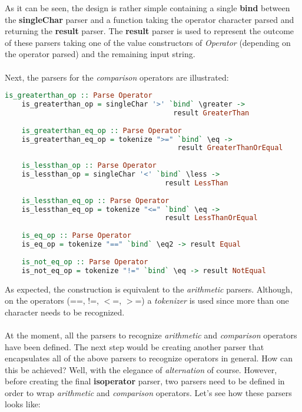 \documentclass[a4paper, onecolumn]{article}
\begin{document}
    \noindent As it can be seen, the design is rather simple containing a single \textbf{bind} between the \textbf{singleChar} parser and a function taking the operator character parsed and returning the \textbf{result} parser. The \textbf{result} parser is used to represent the outcome of these parsers taking one of the value constructors of \textit{Operator} (depending on the operator parsed) and the remaining input string. \\ \\ 
    Next, the parsers for the \textit{comparison} operators are illustrated:
    
    \begin{tcolorbox}
    \begin{lstlisting}[language=Haskell] 
    is_greaterthan_op :: Parse Operator 
    is_greaterthan_op = singleChar '>' `bind` \greater -> 
                                        result GreaterThan
    
    is_greaterthan_eq_op :: Parse Operator 
    is_greaterthan_eq_op = tokenize ">=" `bind` \eq -> 
                                         result GreaterThanOrEqual
    
    is_lessthan_op :: Parse Operator 
    is_lessthan_op = singleChar '<' `bind` \less ->
                                      result LessThan
    
    is_lessthan_eq_op :: Parse Operator 
    is_lessthan_eq_op = tokenize "<=" `bind` \eq -> 
                                      result LessThanOrEqual
    
    is_eq_op :: Parse Operator
    is_eq_op = tokenize "==" `bind` \eq2 -> result Equal
    
    is_not_eq_op :: Parse Operator
    is_not_eq_op = tokenize "!=" `bind` \eq -> result NotEqual
    \end{lstlisting}
    \end{tcolorbox}
    
    \noindent As expected, the construction is equivalent to the \textit{arithmetic} parsers. Although, on the operators (==, !=, $<$=, $>$=) a \textit{tokenizer} is used since more than one character needs to be recognized. \\ \\
    At the moment, all the parsers to recognize \textit{arithmetic} and \textit{comparison} operators have been defined. The next step would be creating another parser that encapsulates all of the above parsers to recognize operators in general. How can this be achieved? Well, with the elegance of \textit{alternation} of course. However, before creating the final \textbf{is\textunderscore operator} parser, two parsers need to be defined in order to wrap \textit{arithmetic} and \textit{comparison} operators. Let's see how these parsers looks like:
    
\end{document}

